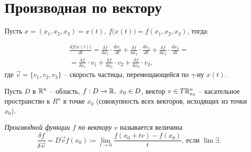 

\section{Производная по вектору}

Пусть $ x = (x_1,x_2,x_3) = x(t), \ f\big(x(t)\big) = f(x_1,x_2,x_3)$, тогда:

\begin{multline*}
    \frac{df\big(x(t)\big)}{dt} = \frac{\delta f}{\delta x_1} \cdot \frac{dx_1}{dt} + \frac{\delta f}{\delta x_2} \cdot \frac{dx_2}{dt} + \frac{\delta f}{\delta x_3} \cdot \frac{dx_3}{dt} = \\
    = \frac{\delta f}{\delta x_1} \cdot v_1 + \frac{\delta f}{\delta x_2} \cdot v_2 + \frac{\delta f}{\delta x_3} \cdot v_3,
\end{multline*}
где $\vec{v} = \{v_1,v_2,v_3\}$ -- скорость частицы, перемещающейся по $\gamma$-ну $x(t)$.

\begin{definition}
    Пусть $ D $ в $ \mathbb{R}^n $ -- область, $ f:D\rightarrow \mathbb{R}, \ x_0 \in D $, вектор $ v\in T\mathbb{R}_{x_0}^n $ -- касательное пространство к $ R^n $ в точке $ x_0 $ (совокупность всех векторов, исходящих из точки $ x_0 $).

    \emph{Производной функции $ f $ по вектору $ v $} называется величина
    \[
        \frac{\delta f}{\delta \vec{v}} = D \vec{v} f(x_0) \coloneqq \underset{t \rightarrow 0}{\lim}\frac{f(x_0 + tv) - f(x_0)}{t}\text{, если }\lim \exists.
    \]
\end{definition}

